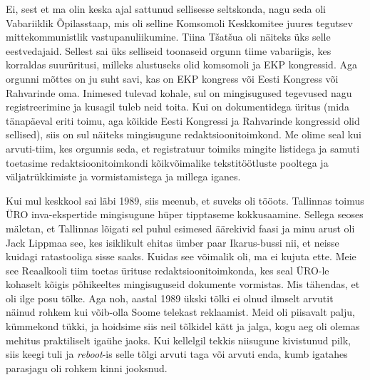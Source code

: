 Ei, sest et ma olin keska ajal sattunud sellisesse seltskonda, nagu seda oli 
Vabariiklik Õpilasstaap, mis oli selline 
Komsomoli Keskkomitee juures tegutsev mittekommunistlik vastupanuliikumine. 
Tiina Tšatšua oli näiteks üks selle eestvedajaid. 
Sellest sai üks selliseid toonaseid orgunn tiime vabariigis, kes korraldas 
suurüritusi, milleks alustuseks olid komsomoli ja EKP kongressid. Aga orgunni 
mõttes on ju suht savi, kas on EKP kongress või Eesti Kongress või Rahvarinde 
oma. Inimesed tulevad kohale, sul on mingisugused tegevused nagu  
registreerimine ja kusagil tuleb neid toita. Kui on dokumentidega üritus (mida 
tänapäeval eriti toimu, aga kõikide Eesti Kongressi ja Rahvarinde kongressid 
olid sellised), siis on sul näiteks mingisugune redaktsioonitoimkond. Me olime 
seal kui arvuti-tiim, kes orgunnis seda, et registratuur toimiks mingite 
listidega ja samuti toetasime redaktsioonitoimkondi  kõikvõimalike 
tekstitöötluste pooltega ja  väljatrükkimiste ja vormistamistega ja millega 
iganes. 

Kui mul  keskkool sai läbi 1989, siis meenub, et suveks oli tööots. Tallinnas 
toimus ÜRO inva-ekspertide mingisugune hüper tipptaseme kokkusaamine. Sellega 
seoses mäletan, et Tallinnas lõigati sel puhul esimesed äärekivid faasi ja minu 
arust oli Jack Lippmaa see, kes isiklikult ehitas ümber paar 
Ikarus-bussi nii, et neisse  kuidagi  ratastooliga sisse saaks. Kuidas see 
võimalik oli, ma ei kujuta ette. Meie see Reaalkooli tiim toetas ürituse 
redaktsioonitoimkonda,  kes seal ÜRO-le kohaselt kõigis põhikeeltes 
mingisuguseid dokumente vormistas. Mis tähendas, et oli ilge posu tõlke. Aga 
noh, aastal 1989 ükski tõlki ei olnud ilmselt arvutit näinud rohkem kui 
võib-olla Soome telekast reklaamist. Meid oli piisavalt palju, kümmekond tükki, 
 ja hoidsime siis neil tõlkidel kätt ja jalga, kogu aeg oli olemas mehitus  
praktiliselt igaühe jaoks. Kui kellelgil tekkis niisugune kivistunud pilk, siis 
keegi tuli ja \emph{reboot}-is selle tõlgi arvuti taga või arvuti enda, kumb 
igatahes parasjagu oli rohkem kinni jooksnud. 

